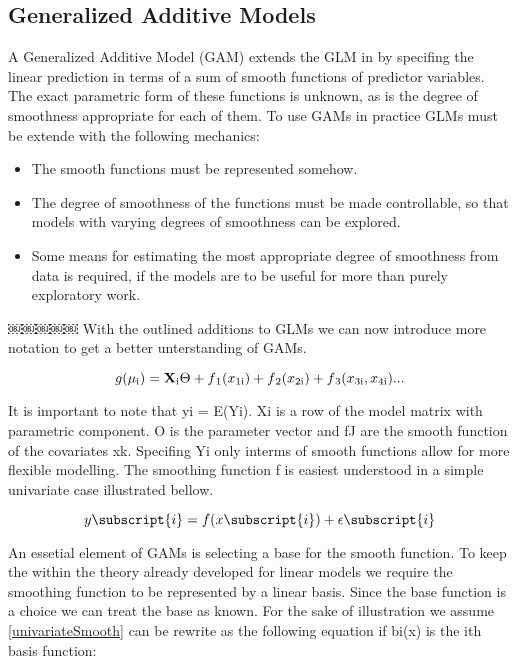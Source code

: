 \documentclass{article}
\begin{document}
    \subsection{Generalized Additive Models}
    A Generalized Additive Model (GAM) extends the GLM in by specifing the linear prediction in terms of a sum of smooth functions of predictor variables. The exact parametric form of these functions is unknown, as is the degree of smoothness appropriate for each of them. To use GAMs in practice GLMs must be extende with the following mechanics:
    \begin{itemize}
        \item The smooth functions must be represented somehow.
        \item The degree of smoothness of the functions must be made controllable, so that models with varying degrees of smoothness can be explored.
        \item Some means for estimating the most appropriate degree of smoothness from data is required, if the models are to be useful for more than purely exploratory work.
    \end{itemize}
￼￼￼￼￼
    With the outlined additions to GLMs we can now introduce more notation to get a better unterstanding of GAMs.

    \begin{equation} \label{GAM} g(\mu\textsubscript{i}) = \mathbf{X} \textsubscript{i} \Theta + f\textsubscript{1}(x\textsubscript{1i}) + f\textsubscript{2}(x\textsubscript{2i}) + f\textsubscript{3}(x\textsubscript{3i}, x\textsubscript{4i}) ... \end{equation}

    It is important to note that yi = E(Yi). Xi is a row of the model matrix with parametric component. O is the parameter vector and fJ are the smooth function of the covariates xk. Specifing Yi only interms of smooth functions allow for more flexible modelling. The smoothing function f is easiest understood in a simple univariate case illustrated bellow.

    \begin{equation} \label{univariateSmooth} y\subscript{i} = f(x\subscript{i}) + \epsilon \subscript{i} \end{equation}

    An essetial element of GAMs is selecting a base for the smooth function. To keep the within the theory already developed for linear models we require the smoothing function to be represented by a linear basis. Since the base function is a choice we can treat the base as known. For the sake of illustration we assume \ref{univariateSmooth} can be rewrite as the following equation if bi(x) is the ith basis function:
\end{document}
